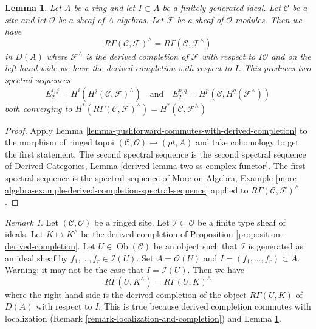 \documentclass{stacks-project}
\theoremstyle{plain}
\newtheorem{lemma}[subsection]{Lemma}
\theoremstyle{definition}
\theoremstyle{remark}
\newtheorem{remark}[subsection]{Remark}
\numberwithin{equation}{subsection}
\def\Ob{\mathop{\mathrm{Ob}}\nolimits}
\begin{document}
\begin{lemma}
\label{lemma-formal-functions-general}
Let $A$ be a ring and let $I \subset A$ be a finitely generated ideal.
Let $\mathcal{C}$ be a site and let $\mathcal{O}$ be a sheaf
of $A$-algebras. Let $\mathcal{F}$ be a sheaf of $\mathcal{O}$-modules.
Then we have
$$
R\Gamma(\mathcal{C}, \mathcal{F})^\wedge =
R\Gamma(\mathcal{C}, \mathcal{F}^\wedge)
$$
in $D(A)$ where $\mathcal{F}^\wedge$ is the derived
completion of $\mathcal{F}$ with respect to $I\mathcal{O}$ and on the
left hand wide we have the derived completion with respect to $I$.
This produces two spectral sequences
$$
E_2^{i, j} = H^i(H^j(\mathcal{C}, \mathcal{F})^\wedge)
\quad\text{and}\quad
E_2^{p, q} = H^p(\mathcal{C}, H^q(\mathcal{F}^\wedge))
$$
both converging to
$H^*(R\Gamma(\mathcal{C}, \mathcal{F})^\wedge) =
H^*(\mathcal{C}, \mathcal{F}^\wedge)$
\end{lemma}

\begin{proof}
Apply Lemma \ref{lemma-pushforward-commutes-with-derived-completion}
to the morphism of ringed topoi $(\mathcal{C}, \mathcal{O}) \to (pt, A)$
and take cohomology to get the first statement. The second spectral sequence
is the second spectral sequence of
Derived Categories, Lemma \ref{derived-lemma-two-ss-complex-functor}.
The first spectral sequence is the spectral sequence of
More on Algebra, Example
\ref{more-algebra-example-derived-completion-spectral-sequence}
applied to $R\Gamma(\mathcal{C}, \mathcal{F})^\wedge$.
\end{proof}

\begin{remark}
\label{remark-local-calculation-derived-completion}
Let $(\mathcal{C}, \mathcal{O})$ be a ringed site.
Let $\mathcal{I} \subset \mathcal{O}$ be a finite type sheaf of
ideals. Let $K \mapsto K^\wedge$ be the derived completion of
Proposition \ref{proposition-derived-completion}.
Let $U \in \Ob(\mathcal{C})$ be an object such that $\mathcal{I}$
is generated as an ideal sheaf by $f_1, \ldots, f_r \in \mathcal{I}(U)$.
Set $A = \mathcal{O}(U)$ and $I = (f_1, \ldots, f_r) \subset A$.
Warning: it may not be the case that $I = \mathcal{I}(U)$.
Then we have
$$
R\Gamma(U, K^\wedge) = R\Gamma(U, K)^\wedge
$$
where the right hand side is the derived completion of
the object $R\Gamma(U, K)$ of $D(A)$ with respect to $I$.
This is true because derived completion commutes with localization
(Remark \ref{remark-localization-and-completion}) and
Lemma \ref{lemma-formal-functions-general}.
\end{remark}
\end{document}
